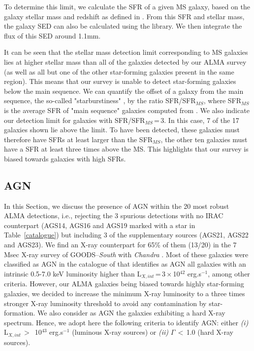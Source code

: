 \documentclass[longauth]{aa}
\begin{document}
To determine this limit, we calculate the SFR of a given MS galaxy, based on the galaxy stellar mass and redshift as defined in \cite{Schreiber2015}. From this SFR and stellar mass, the galaxy SED can also be calculated using the \cite{Schreiber2017} library. We then integrate the flux of this SED around 1.1mm.
 
It can be seen that the stellar mass detection limit corresponding to MS galaxies lies at higher stellar mass than all of the galaxies detected by our ALMA survey (as well as all but one of the other star-forming galaxies present in the same region). This means that our survey is unable to detect star-forming galaxies below the main sequence.  We can quantify the offset of a galaxy from the main sequence, the so-called "starburstiness" \citep{Elbaz2011}, by the ratio SFR/SFR$_{MS}$, where SFR$_{MS}$ is the average SFR of "main sequence" galaxies computed from \cite{Schreiber2015}. We also indicate our detection limit for galaxies with SFR/SFR$_{MS}$\,=\,3. In this case, 7 of the 17 galaxies shown lie above the limit. To have been detected, these galaxies must therefore have SFRs at least larger than the SFR$_{MS}$, the other ten galaxies must have a SFR at least three times above the MS. This highlights that our survey is biased towards galaxies with high SFRs.


\subsection{AGN}\label{sec:AGN}

In this Section, we discuss the presence of AGN within the 20 most robust ALMA detections, i.e., rejecting the 3 spurious detections with no IRAC counterpart (AGS14, AGS16 and AGS19 marked with a star in Table~\ref{catalogue}) but including 3 of the supplementary sources (AGS21, AGS22 and AGS23). We find an X-ray counterpart for 65\% of them (13/20) in the 7 Msec X-ray survey of GOODS--\textit{South} with \textit{Chandra} \citep{Luo2017}. Most of these galaxies were classified as AGN in the catalogue of \cite{Luo2017} that identifies as AGN all galaxies with an intrinsic 0.5-7.0 keV luminosity higher than L$_{X,int}$\,=\,3\,$\times$\,10$^{42}$ erg.s$^{-1}$, among other criteria. However, our ALMA galaxies being biased towards highly star-forming galaxies, we decided to increase the minimum X-ray luminosity to a three times stronger X-ray luminosity threshold to avoid any contamination by star-formation. We also consider as AGN the galaxies exhibiting a hard X-ray spectrum. Hence, we adopt here the following criteria to identify AGN: either \textit{(i)} L$_{X,int}$\,$>$\, 10$^{43}$ erg.s$^{-1}$ (luminous X-ray sources) or \textit{(ii)} $\Gamma$\,$<$\,1.0 (hard X-ray sources).
\end{document}

